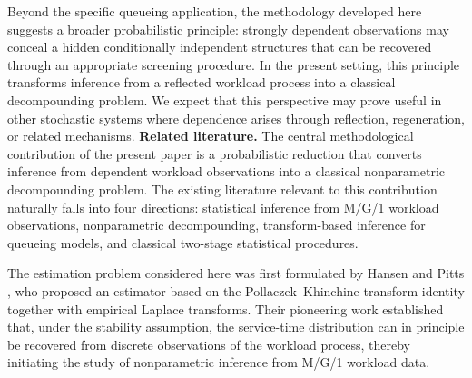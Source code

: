 \documentclass[12pt]{article}
\newcommand{\1}{\mathbf{1}}
\begin{document}
Beyond the specific queueing application, the methodology developed here suggests a broader probabilistic principle: strongly dependent observations may conceal a hidden conditionally independent structures that can be recovered through an appropriate screening procedure. In the present setting, this principle transforms inference from a reflected workload process into a classical decompounding problem. We expect that this perspective may prove useful in other stochastic systems where dependence arises through reflection, regeneration, or related mechanisms.\newline\newline
\noindent\textbf{Related literature.}
The central methodological contribution of the present paper is a probabilistic
reduction that converts inference from dependent workload observations into a
classical nonparametric decompounding problem. The existing literature relevant
to this contribution naturally falls into four directions: statistical inference
from M/G/1 workload observations, nonparametric decompounding, transform-based
inference for queueing models, and classical two-stage statistical procedures.

The estimation problem considered here was first formulated by Hansen and Pitts
\cite{Hansen2006}, who proposed an estimator based on the
Pollaczek--Khinchine transform identity together with empirical Laplace
transforms. Their pioneering work established that, under the stability
assumption, the service-time distribution can in principle be recovered from
discrete observations of the workload process, thereby initiating the study of
nonparametric inference from M/G/1 workload data.
\end{document}
